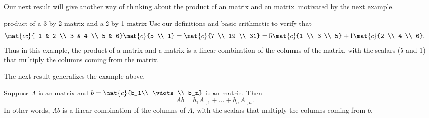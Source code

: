 Our next result will give another way of thinking about the product of an  matrix and an  matrix, motivated by the next example.

\begin{example}{product of a  3-by-2 matrix and a 2-by-1 matrix}
Use our definitions and basic arithmetic to verify that
\[
\mat{cc}{ 1 & 2 \\ 3 & 4 \\ 5 & 6}
\mat{c}{5 \\ 1}
= 
\mat{c}{7 \\ 19 \\ 31}
= 5
\mat{c}{1 \\ 3 \\ 5}
 + 1
\mat{c}{2 \\ 4 \\ 6}.
\]
Thus in this example, the product of a  matrix and a  matrix is a linear combination of the columns of the  matrix, with the scalars ($5$ and $1$) that multiply the columns coming from the  matrix.
\end{example}

\pagebreak[2]

The next result generalizes the example above.

{Suppose $A$ is an  matrix and
$
b = \mat{c}{b_1\\ \vdots \\ b_n}
$
is an  matrix. Then
\[
Ab = b_1 A_{\cdot, 1} + \dots + b_n \, A_{\cdot, n}.
\]
In other words, $Ab$ is a linear combination of the columns of $A$, with the scalars that multiply the columns coming from $b$.}

